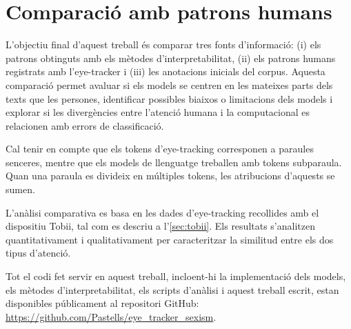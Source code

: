 \section{Comparació amb patrons humans}

L'objectiu final d'aquest treball és comparar tres fonts d'informació: (i) els patrons obtinguts amb els mètodes d'interpretabilitat, (ii) els patrons humans registrats amb l'eye-tracker i (iii) les anotacions inicials del corpus.
Aquesta comparació permet avaluar si els models se centren en les mateixes parts dels texts que les persones, identificar possibles biaixos o limitacions dels models i explorar si les divergències entre l'atenció humana i la computacional es relacionen amb errors de classificació.

Cal tenir en compte que els tokens d'eye-tracking corresponen a paraules senceres, mentre que els models de llenguatge treballen amb tokens subparaula.
Quan una paraula es divideix en múltiples tokens, les atribucions d'aquests se sumen.

L'anàlisi comparativa es basa en les dades d'eye-tracking recollides amb el dispositiu Tobii, tal com es descriu a l'\autoref{sec:tobii}.
Els resultats s'analitzen quantitativament i qualitativament per caracteritzar la similitud entre els dos tipus d'atenció.


Tot el codi fet servir en aquest treball, incloent-hi la implementació dels models, els mètodes d'interpretabilitat, els scripts d'anàlisi i aquest treball escrit, estan disponibles públicament al repositori GitHub: \url{https://github.com/Pastells/eye\_tracker\_sexism}. 
